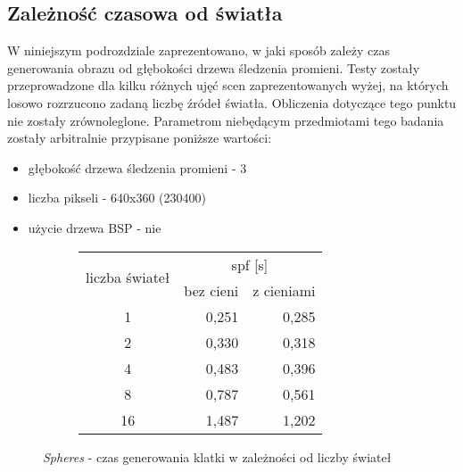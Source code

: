 \subsection{Zależność czasowa od światła}

W niniejszym podrozdziale zaprezentowano, w jaki sposób zależy czas generowania obrazu od głębokości drzewa śledzenia promieni. Testy zostały przeprowadzone dla kilku różnych ujęć scen zaprezentowanych wyżej, na których losowo rozrzucono zadaną liczbę źródeł światła. Obliczenia dotyczące tego punktu nie zostały zrównoleglone. Parametrom niebędącym przedmiotami tego badania zostały arbitralnie przypisane poniższe wartości:

\begin{itemize}
\item głębokość drzewa śledzenia promieni - 3
\item liczba pikseli - 640x360 (230400)
\item użycie drzewa BSP - nie
\end{itemize}

\begin{figure}[H]
\begin{subfigure}{.45\textwidth}
\end{subfigure}
\hfill
\begin{subfigure}{.45\textwidth}
		\caption{Tabla z wynikami}
		\begin{longtable}{|c|r|r|} \hline
		\multirow{2}{*}{liczba świateł} & \multicolumn{2}{|c|}{spf [s]} \\ \cline{2-3}
	    & bez cieni & z cieniami \\ \hline
	    1 & 0,251 & 0,285 \\
	    2 & 0,330 & 0,318 \\
		4 & 0,483 & 0,396 \\
		8 & 0,787 & 0,561 \\
		16 & 1,487 & 1,202 \\
		\hline
		\end{longtable}
\end{subfigure}
\caption{\emph{Spheres} - czas generowania klatki w zależności od liczby świateł}
\end{figure}

